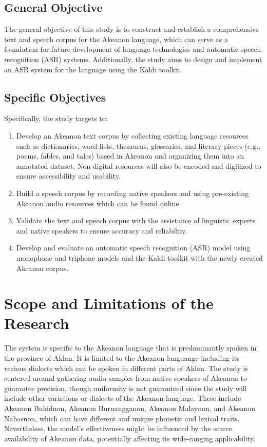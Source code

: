 \subsection{General Objective}
\label{sec:generalobjective}

The general objective of this study is to construct and establish a comprehensive text and speech corpus for the Akeanon language, which can serve as a foundation for future development of language technologies and automatic speech recognition (ASR) systems. Additionally, the study aims to design and implement an ASR system for the language using the Kaldi toolkit.

\subsection{Specific Objectives}
\label{sec:specificobjectives}

Specifically, the study targets to:
\begin{enumerate}
    \item Develop an Akeanon text corpus by collecting existing language resources such as dictionaries, word lists, thesaurus, glossaries, and literary pieces (e.g., poems, fables, and tales) based in Akeanon and organizing them into an annotated dataset. Non-digital resources will also be encoded and digitized to ensure accessibility and usability.
    \item Build a speech corpus by recording native speakers and using pre-existing Akeanon audio resources which can be found online.
    \item Validate the text and speech corpus with the assistance of linguistic experts and native speakers to ensure accuracy and reliability.
    \item Develop and evaluate an automatic speech recognition (ASR) model using monophone and triphone models and the Kaldi toolkit with the newly created Akeanon corpus.
 \end{enumerate}
 
\section{Scope and Limitations of the Research}
\label{sec:scopelimitations}

The system is specific to the Akeanon language that is predominantly spoken in the province of Aklan. It is limited to the Akeanon languange including its various dialects which can be spoken in different parts of Aklan. The study is centered around gathering audio samples from native speakers of Akeanon to guarantee precision, though uniformity is not guaranteed since the study will include other variations or dialects of the Akeanon language. These include Akeanon Bukidnon, Akeanon Buruangganon, Akeanon Malaynon, and Akeanon Nabasnon, which can have different and unique phonetic and lexical traits. Nevertheless, the model's effectiveness might be influenced by the scarce availability of Akeanon data, potentially affecting its wide-ranging applicability.


